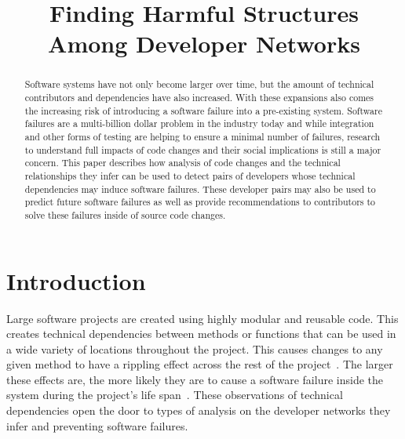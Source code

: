 \documentclass[conference]{IEEEtran}
\begin{document}
\title{Finding Harmful Structures Among Developer Networks}

\author{
}

\maketitle


\begin{abstract}
Software systems have not only become larger over time, but the amount of
technical contributors and dependencies have also increased. With these expansions also comes
the increasing risk of introducing a software failure into a pre-existing system.
Software failures are a multi-billion dollar problem in the industry today and while integration and
other forms of testing are helping to ensure a minimal number of failures, research to understand
full impacts of code changes and their social implications is still a major concern. This paper describes
how analysis of code changes and the technical relationships they infer can be used to detect pairs
of developers whose technical dependencies may induce software failures. These developer pairs may
also be used to predict future software failures as well as provide recommendations to contributors
to solve these failures inside of source code changes.
\end{abstract}


\section{Introduction}

Large software projects are created using highly modular and 
reusable code. This creates technical dependencies between methods or functions
that can be used in a wide variety of locations throughout the project. 
This causes changes to any given method to have a rippling 
effect across the rest of the project~\cite{Acharya:2011:PCI}. The larger these effects are,
the more likely they are to cause a software failure inside the system during the project's
life span~\cite{Zimmermann:2008:PDU}. These observations of technical dependencies open
the door to types of analysis on the developer networks they infer and preventing software
failures.
\end{document}
